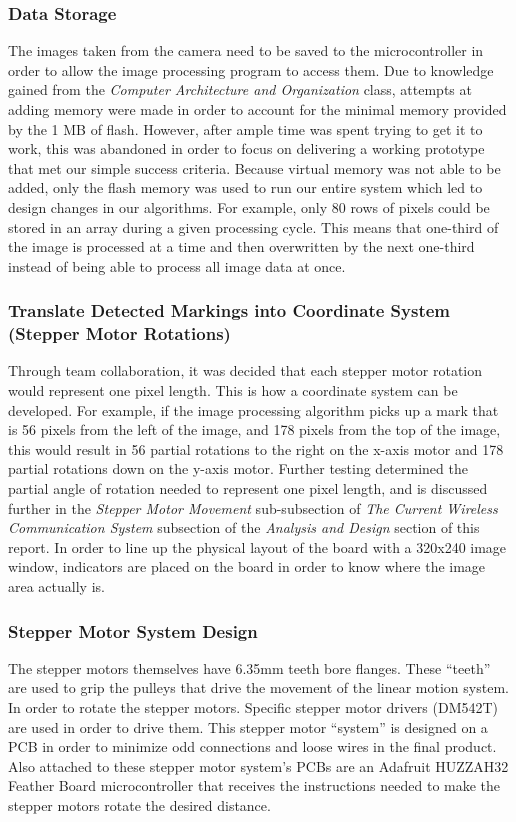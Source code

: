 \subsubsection{Data Storage}
The images taken from the camera need to be saved to the microcontroller in order to allow the image processing program to access them. Due to knowledge gained from the \textit{Computer Architecture and Organization} class, attempts at adding memory were made in order to account for the minimal memory provided by the 1 MB of flash. However, after ample time was spent trying to get it to work, this was abandoned in order to focus on delivering a working prototype that met our simple success criteria. Because virtual memory was not able to be added, only the flash memory was used to run our entire system which led to design changes in our algorithms. For example, only 80 rows of pixels could be stored in an array during a given processing cycle. This means that one-third of the image is processed at a time and then overwritten by the next one-third instead of being able to process all image data at once.\\
\subsubsection{Translate Detected Markings into Coordinate System (Stepper Motor Rotations)}
Through team collaboration, it was decided that each stepper motor rotation would represent one pixel length. This is how a coordinate system can be developed. For example, if the image processing algorithm picks up a mark that is 56 pixels from the left of the image, and 178 pixels from the top of the image, this would result in 56 partial rotations to the right on the x-axis motor and 178 partial rotations down on the y-axis motor. Further testing determined the partial angle of rotation needed to represent one pixel length, and is discussed further in the \textit{Stepper Motor Movement} sub-subsection of \textit{The Current Wireless Communication System} subsection of the \textit{Analysis and Design} section of this report. In order to line up the physical layout of the board with a 320x240 image window, indicators are placed on the board in order to know where the image area actually is.\\
\subsubsection{Stepper Motor System Design}
The stepper motors themselves have 6.35mm teeth bore flanges. These ``teeth'' are used to grip the pulleys that drive the movement of the linear motion system. In order to rotate the stepper motors. Specific stepper motor drivers (DM542T) are used in order to drive them. This stepper motor ``system'' is designed on a PCB in order to minimize odd connections and loose wires in the final product. Also attached to these stepper motor system's PCBs are an Adafruit HUZZAH32 Feather Board microcontroller that receives the instructions needed to make the stepper motors rotate the desired distance.\\
